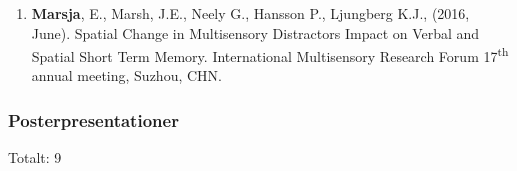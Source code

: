 \documentclass[]{article}
\providecommand{\tightlist}{%
  \setlength{\itemsep}{0pt}\setlength{\parskip}{0pt}}
\begin{document}
\begin{enumerate}
\def\labelenumi{\arabic{enumi}.}
\tightlist
\item
  \textbf{Marsja}, E., Marsh, J.E., Neely G., Hansson P., Ljungberg
  K.J., (2016, June). Spatial Change in Multisensory Distractors Impact
  on Verbal and Spatial Short Term Memory. International Multisensory
  Research Forum 17\textsuperscript{th} annual meeting, Suzhou, CHN.
\end{enumerate}

\hypertarget{posterpresentationer}{%
\subsubsection{Posterpresentationer}\label{posterpresentationer}}

Totalt: 9
\end{document}
